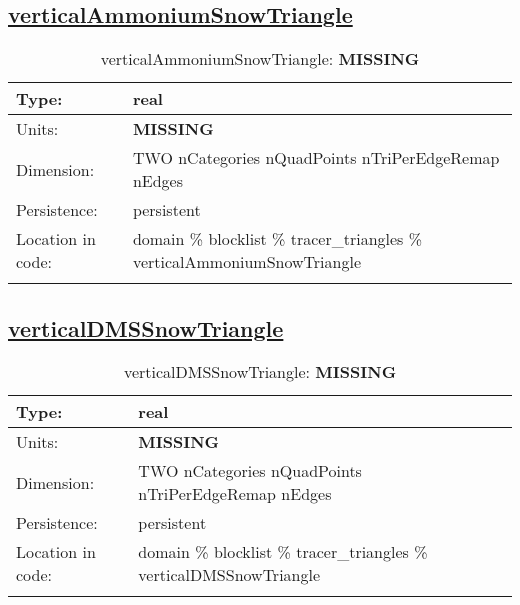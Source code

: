 \subsection[verticalAmmoniumSnowTriangle]{\hyperref[sec:var_tab_tracer_triangles]{verticalAmmoniumSnowTriangle}}
\label{subsec:var_sec_tracer_triangles_verticalAmmoniumSnowTriangle}
\begin{center}
\begin{longtable}{| p{2.0in} | p{4.0in} |}
        \hline 
        Type: & real \\
        \hline 
        Units: & {\bf \color{red} MISSING} \\
        \hline 
        Dimension: & TWO nCategories nQuadPoints nTriPerEdgeRemap nEdges \\
        \hline 
        Persistence: & persistent \\
        \hline 
         Location in code: & domain \% blocklist \% tracer\_triangles \% verticalAmmoniumSnowTriangle \\
         \hline 
    \caption{verticalAmmoniumSnowTriangle: {\bf \color{red} MISSING}}
\end{longtable}
\end{center}
\subsection[verticalDMSSnowTriangle]{\hyperref[sec:var_tab_tracer_triangles]{verticalDMSSnowTriangle}}
\label{subsec:var_sec_tracer_triangles_verticalDMSSnowTriangle}
\begin{center}
\begin{longtable}{| p{2.0in} | p{4.0in} |}
        \hline 
        Type: & real \\
        \hline 
        Units: & {\bf \color{red} MISSING} \\
        \hline 
        Dimension: & TWO nCategories nQuadPoints nTriPerEdgeRemap nEdges \\
        \hline 
        Persistence: & persistent \\
        \hline 
         Location in code: & domain \% blocklist \% tracer\_triangles \% verticalDMSSnowTriangle \\
         \hline 
    \caption{verticalDMSSnowTriangle: {\bf \color{red} MISSING}}
\end{longtable}
\end{center}

